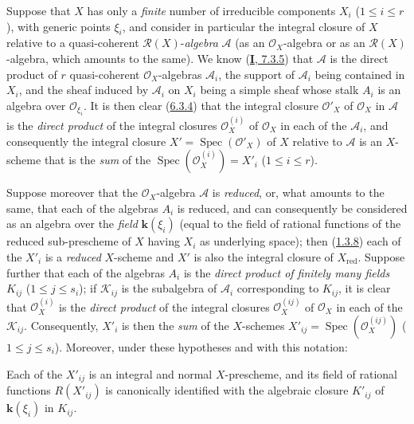 \begin{env}[6.3.6]
\label{II.6.3.6}
Suppose that $X$ has only a \emph{finite} number of irreducible components
$X_i$ ($1\leq i\leq r$), with generic points $\xi_i$, and consider in
particular the integral closure of $X$ relative to a quasi-coherent
$\mathcal{R}(X)$-\emph{algebra} $\mathcal{A}$ (as an $\mathcal{O}_X$-algebra or as
an $\mathcal{R}(X)$-algebra, which amounts to the same). We know
(\hyperref[I.7.3.5]{\textbf{I}, 7.3.5}) that $\mathcal{A}$ is the direct product
of $r$ quasi-coherent $\mathcal{O}_X$-algebras $\mathcal{A}_i$, the support
of $\mathcal{A}_i$ being contained in $X_i$, and the sheaf induced by
$\mathcal{A}_i$ on $X_i$ being a simple sheaf whose stalk $A_i$ is an
algebra over $\mathcal{O}_{\xi_i}$. It is then clear
(\hyperref[II.6.3.4]{6.3.4}) that the integral closure $\mathcal{O}'_X$ of
$\mathcal{O}_X$ in $\mathcal{A}$ is the \emph{direct product} of the integral
closures $\mathcal{O}^{(i)}_X$ of $\mathcal{O}_X$ in each of the
$\mathcal{A}_i$, and consequently the integral closure
$X'=\operatorname{Spec}(\mathcal{O}'_X)$ of $X$ relative to $\mathcal{A}$ is
an $X$-scheme that is the \emph{sum} of the
$\operatorname{Spec}(\mathcal{O}^{(i)}_X)=X'_i$ ($1\leq i\leq r$).

Suppose moreover that the $\mathcal{O}_X$-algebra $\mathcal{A}$ is
\emph{reduced}, or, what amounts to the same, that each of the algebras $A_i$
is reduced, and can consequently be considered as an algebra over the
\emph{field} $\boldsymbol{k}(\xi_i)$ (equal to the field of rational functions of the
reduced sub-prescheme of $X$ having $X_i$ as underlying space); then
(\hyperref[II.1.3.8]{1.3.8}) each of the $X'_i$ is a \emph{reduced}
$X$-scheme and $X'$ is also the integral closure of $X_{\mathrm{red}}$.
Suppose further that each of the algebras $A_i$ is the \emph{direct product
of finitely many fields} $K_{ij}$ ($1\leq j\leq s_i$); if
$\mathcal{K}_{ij}$ is the subalgebra of $\mathcal{A}_i$ corresponding to
$K_{ij}$, it is clear that $\mathcal{O}^{(i)}_X$ is the \emph{direct product}
of the integral closures $\mathcal{O}^{(ij)}_X$ of $\mathcal{O}_X$ in each of
the $\mathcal{K}_{ij}$. Consequently, $X'_i$ is then the \emph{sum} of the
$X$-schemes $X'_{ij}=\operatorname{Spec}(\mathcal{O}^{(ij)}_X)$
($1\leq j\leq s_i$). Moreover, under these hypotheses and with this
notation:
\end{env}


\begin{proposition}[6.3.7]
\label{II.6.3.7}
Each of the $X'_{ij}$ is an integral and normal $X$-prescheme, and its field
of rational functions $R(X'_{ij})$ is canonically identified with the
algebraic closure $K'_{ij}$ of $\boldsymbol{k}(\xi_i)$ in $K_{ij}$.
\end{proposition}

